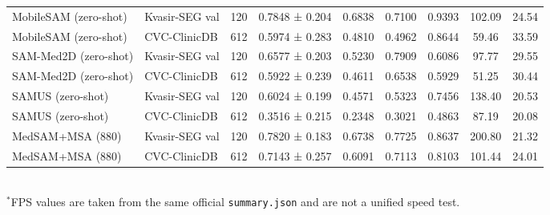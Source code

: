 \begin{table}[ht]
\begin{tabular}{llccccccc}
MobileSAM (zero-shot) & Kvasir-SEG val & 120 & 0.7848 ± 0.204 & 0.6838 & 0.7100 & 0.9393 & 102.09 & 24.54 \\
MobileSAM (zero-shot) & CVC-ClinicDB & 612 & 0.5974 ± 0.283 & 0.4810 & 0.4962 & 0.8644 & 59.46 & 33.59 \\
SAM-Med2D (zero-shot) & Kvasir-SEG val & 120 & 0.6577 ± 0.203 & 0.5230 & 0.7909 & 0.6086 & 97.77 & 29.55 \\
SAM-Med2D (zero-shot) & CVC-ClinicDB & 612 & 0.5922 ± 0.239 & 0.4611 & 0.6538 & 0.5929 & 51.25 & 30.44 \\
SAMUS (zero-shot) & Kvasir-SEG val & 120 & 0.6024 ± 0.199 & 0.4571 & 0.5323 & 0.7456 & 138.40 & 20.53 \\
SAMUS (zero-shot) & CVC-ClinicDB & 612 & 0.3516 ± 0.215 & 0.2348 & 0.3021 & 0.4863 & 87.19 & 20.08 \\
MedSAM+MSA (880) & Kvasir-SEG val & 120 & 0.7820 ± 0.183 & 0.6738 & 0.7725 & 0.8637 & 200.80 & 21.32 \\
MedSAM+MSA (880) & CVC-ClinicDB & 612 & 0.7143 ± 0.257 & 0.6091 & 0.7113 & 0.8103 & 101.44 & 24.01 \\
\bottomrule
\end{tabular}
\\[0.4em]{\small $^*$FPS values are taken from the same official \texttt{summary.json} and are not a unified speed test.}
\end{table}
